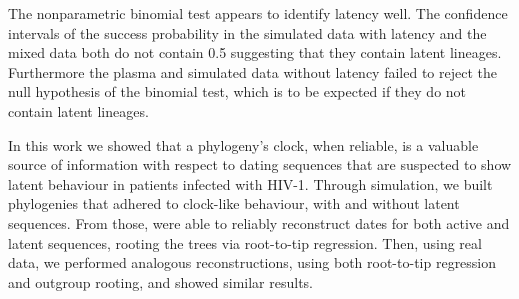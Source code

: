 \documentclass[12pt]{article}
\begin{document}
The nonparametric binomial test appears to identify latency well.
The confidence intervals of the success probability in the simulated data with latency and the mixed data both do not contain 0.5 suggesting that they contain latent lineages.
Furthermore the plasma and simulated data without latency failed to reject the null hypothesis of the binomial test, which is to be expected if they do not contain latent lineages.








In this work we showed that a phylogeny's clock, when reliable, is a valuable source of information with respect to dating sequences that are suspected to show latent behaviour in patients infected with HIV-1. 
Through simulation, we built phylogenies that adhered to clock-like behaviour, with and without latent sequences.
From those, were able to reliably reconstruct dates for both active and latent sequences, rooting the trees via root-to-tip regression.
Then, using real data, we performed analogous reconstructions, using both root-to-tip regression and outgroup rooting, and showed similar results.
\end{document}
